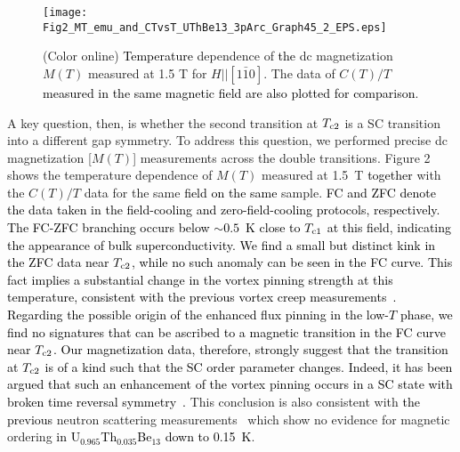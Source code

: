 \documentclass[twocolumn, prl]{revtex4}%
\newcommand{\correct}[1]{\textcolor{black}{#1}}
\begin{document}
\begin{centering}
\begin{figure}%
\texttt{[image: Fig2\_MT\_emu\_and\_CTvsT\_UThBe13\_3pArc\_Graph45\_2\_EPS.eps]}
\caption{ (Color online)  \correct{Temperature} dependence of \correct{the} dc magnetization  $M(T)$ measured at 1.5 T
  for $H$$||$$[1\bar{1}0]$.  The data of $C(T)/T$ \correct{measured in the same magnetic field are also plotted for comparison}.
   }
\end{figure}
\end{centering}





A  key question, then,  is  whether the second transition at $T_{\rm c2}$ is a SC transition into a different gap symmetry.
 To address this question, we performed precise dc magnetization [$M(T)$] measurements  across the double transitions.
Figure 2 shows the temperature dependence of  $M(T)$ measured at 1.5~T \correct{together} with the $C(T)/T$ data for the same \correct{field on the same} sample.
\correct{FC and ZFC denote the data taken in the field-cooling and zero-field-cooling protocols, respectively.}
\correct{The FC-ZFC branching occurs below $\sim 0.5$~K close to $T_{\rm c1}$ at this field, indicating the appearance of bulk superconductivity.}
\correct{We find a small but distinct kink in the ZFC data near $T_{\rm c2}$, while no such anomaly can be seen in the FC curve. This fact implies a substantial change in the vortex pinning strength at this temperature,  consistent with the previous vortex creep measurements~\cite{Zieve95,Mota2000}. }
\correct{Regarding the possible origin of the enhanced flux pinning in the low-$T$ phase, we find no signatures that can be ascribed to a magnetic transition in the FC curve near $T_{\rm c2}$.}
\correct{Our magnetization data, therefore, strongly suggest that the transition at $T_{\rm c2}$ is of a kind such that the SC order parameter changes. Indeed, it has been argued that such an enhancement of the vortex pinning occurs in a SC state with broken time reversal symmetry~\cite{Zieve95}.}
This conclusion is also consistent with  \correct{the previous} neutron scattering measurements~\cite{Hiess_PRB_2002} 
 which show no evidence for magnetic ordering \correct{in U$_{0.965}$Th$_{0.035}$Be$_{13}$ down to 0.15~K}.
\end{document}
